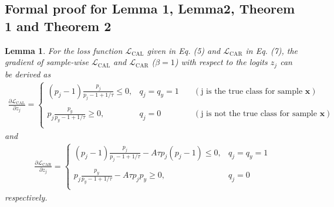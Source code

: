 \documentclass{article}
\newtheorem{lemma}{Lemma}
\begin{document}
\subsection{Formal proof for Lemma 1, Lemma2, Theorem 1 and Theorem 2}
\label{apd:proof}
\begin{lemma}
	\label{lemma1}
	For the loss function $\mathcal{L}_\text{CAL}$ given in Eq. (5) and $\mathcal{L}_\text{CAR}$ in Eq. (7), the gradient of sample-wise $\mathcal{L}_\text{CAL}$ and $\mathcal{L}_\text{CAR}$ ($\beta=1$) with respect to the logits $z_{j}$ can be derived as
	\begin{align}
\frac{\partial \mathcal{L}_\textrm{CAL}}{\partial z_{j}}=\left\{ \begin{array}{lll}
			(p_{j}-1)\frac{p_{j}}{p_{j}-1+1/\tau} \le 0, & q_{j}=q_{y}=1\quad& (\text{j is the true class for sample } \bm{x})\\\\
			p_{j}\frac{p_{y}}{p_{y}-1+1/\tau}\ge 0, & q_{j}=0 \quad &(\text{j is not the true class for sample }\bm{x})  \nonumber\\
		\end{array} \right.
	\end{align}
	and
	\begin{align}
\frac{\partial \mathcal{L}_\textrm{CAR}}{\partial z_{j}}=\left\{ \begin{array}{ll}
			(p_{j}-1) \frac{ p_{j}}{p_{j}-1 +1/\tau}-A\tau p_{j}(p_{j}-1) \le 0, & q_{j}=q_{y}=1\\\\
			p_{j}\frac{p_{y}}{p_{y}-1+1/\tau}-A\tau p_{j}p_{y} \ge 0 , & q_{j}=0 \nonumber \\
		\end{array} \right.
	\end{align}
	respectively.
\end{lemma}
\end{document}
